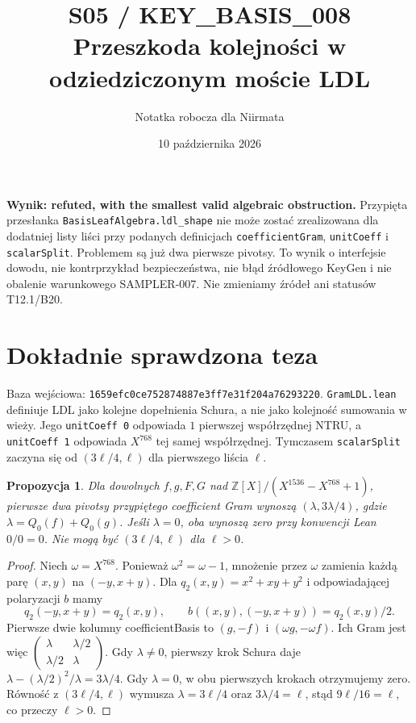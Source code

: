\documentclass[11pt,a4paper]{article}
\title{S05 / KEY\_BASIS\_008\\\large Przeszkoda kolejności w odziedziczonym moście LDL}
\author{Notatka robocza dla Niirmata}\date{10 października 2026}
\newcommand{\code}[1]{\nolinkurl{#1}}
\newtheorem{proposition}{Propozycja}
\begin{document}
\maketitle
\textbf{Wynik: refuted, with the smallest valid algebraic obstruction.}
Przypięta przesłanka \code{BasisLeafAlgebra.ldl_shape} nie może zostać
zrealizowana dla dodatniej listy liści przy podanych definicjach
\code{coefficientGram}, \code{unitCoeff} i \code{scalarSplit}.
Problemem są już dwa pierwsze pivotsy. To wynik o interfejsie dowodu,
nie kontrprzykład bezpieczeństwa, nie błąd źródłowego KeyGen i nie obalenie
warunkowego SAMPLER-007. Nie zmieniamy źródeł ani statusów T12.1/B20.

\section{Dokładnie sprawdzona teza}
Baza wejściowa: \code{1659efc0ce752874887e3ff7e31f204a76293220}.
\code{GramLDL.lean} definiuje LDL jako kolejne dopełnienia Schura,
a nie jako kolejność sumowania w wieży. Jego \code{unitCoeff 0} odpowiada
$1$ pierwszej współrzędnej NTRU, a \code{unitCoeff 1} odpowiada $X^{768}$
tej samej współrzędnej. Tymczasem \code{scalarSplit} zaczyna się od
$(3\ell/4,\ell)$ dla pierwszego liścia $\ell$.

\begin{proposition}
Dla dowolnych $f,g,F,G$ nad $\mathbb Z[X]/(X^{1536}-X^{768}+1)$,
pierwsze dwa pivotsy przypiętego coefficient Gram wynoszą
$(\lambda,3\lambda/4)$, gdzie $\lambda=Q_0(f)+Q_0(g)$.
Jeśli $\lambda=0$, oba wynoszą zero przy konwencji Lean $0/0=0$.
Nie mogą być $(3\ell/4,\ell)$ dla $\ell>0$.
\end{proposition}
\begin{proof}
Niech $\omega=X^{768}$. Ponieważ $\omega^2=\omega-1$, mnożenie przez
$\omega$ zamienia każdą parę $(x,y)$ na $(-y,x+y)$.
Dla $q_2(x,y)=x^2+xy+y^2$ i odpowiadającej polaryzacji $b$ mamy
\[
 q_2(-y,x+y)=q_2(x,y),\qquad
 b((x,y),(-y,x+y))=q_2(x,y)/2.
\]
Pierwsze dwie kolumny coefficientBasis to $(g,-f)$ i
$(\omega g,-\omega f)$. Ich Gram jest więc
$\begin{pmatrix}\lambda&\lambda/2\\\lambda/2&\lambda\end{pmatrix}$.
Gdy $\lambda\ne0$, pierwszy krok Schura daje
$\lambda-(\lambda/2)^2/\lambda=3\lambda/4$.
Gdy $\lambda=0$, w obu pierwszych krokach otrzymujemy zero.
Równość z $(3\ell/4,\ell)$ wymusza
$\lambda=3\ell/4$ oraz $3\lambda/4=\ell$, stąd $9\ell/16=\ell$,
co przeczy $\ell>0$.
\end{proof}
\end{document}
